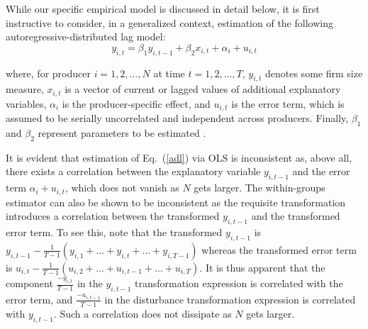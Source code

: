 \documentclass[english]{article}
\begin{document}
While our specific empirical model is discussed in detail below, it is first 
instructive to consider, in a generalized context, estimation of the following 
autoregressive-distributed lag model: 
\begin{equation}
y_{i,t} = \beta_1 y_{i,t-1} + \beta_2 x_{i,t} + \alpha_i +  u_{i,t}
\label{adl}
\end{equation}

\noindent
where, for producer $i=1,2,\ldots,N$ at time $t=1,2,\ldots,T$, $y_{i,t}$ 
denotes some firm size measure, $x_{i,t}$ is a vector of current or lagged 
values of additional explanatory variables, $\alpha_i$ is the producer-specific 
effect, and $u_{i,t}$ is the error term, which is assumed to be serially 
uncorrelated and independent across producers. 
Finally, $\beta_1$ and $\beta_2$ represent parameters to be estimated
\citep{bond2002}.

It is evident that estimation of Eq.\ (\ref{adl}) via OLS is inconsistent as, 
above all, there exists a correlation between the explanatory variable 
$y_{i,t-1}$ and the error term $\alpha_i + u_{i,t}$, which does not vanish 
as $N$ gets larger. 
The within-groups estimator can also be shown to be inconsistent as the 
requisite transformation introduces a correlation between the transformed 
$y_{i,t-1}$ and the transformed error term. 
To see this, note that the transformed $y_{i,t-1}$ is $y_{i,t-1} - 
\frac{1}{T-1} (y_{i,1} + \ldots + y_{i,t} + \ldots + y_{i,T-1})$ 
whereas the transformed error term is $u_{i,t} - \frac{1}{T-1} (u_{i,2} + 
\ldots + u_{i,t-1} + \ldots + u_{i,T})$. 
It is thus apparent that the component $\frac{-y_{i,t}}{T-1}$ in the 
$y_{i,t-1}$ transformation expression is correlated with the error term, 
and $\frac{-u_{i,t-1}}{T-1}$ in the disturbance transformation expression 
is correlated with $y_{i,t-1}$. 
Such a correlation does not dissipate as $N$ gets larger. 
\end{document}
